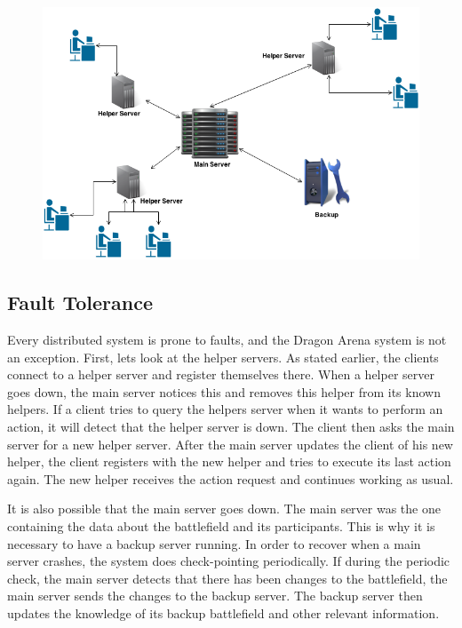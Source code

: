 \begin{figure}[ht]
\includegraphics[scale=0.5]{DCS.png}
\end{figure}

\subsection{Fault Tolerance}
Every distributed system is prone to faults, and the Dragon Arena system is not an exception. 
First, lets look at the helper servers. As stated earlier, the clients connect to a helper server and register themselves there.
When a helper server goes down, the main server notices this and removes this helper from its known helpers.
If a client tries to query the helpers server when it wants to perform an action, it will detect that the helper server is down.
The client then asks the main server for a new helper server.
After the main server updates the client of his new helper, the client registers with the new helper and tries to execute its last action again.
The new helper receives the action request and continues working as usual.

It is also possible that the main server goes down. 
The main server was the one containing the data about the battlefield and its participants.
This is why it is necessary to have a backup server running.  
In order to recover when a main server crashes, the system does check-pointing periodically.
If during the periodic check, the main server detects that there has been changes to the battlefield, the main server sends the changes to the backup server.
The backup server then updates the knowledge of its backup battlefield and other relevant information.

